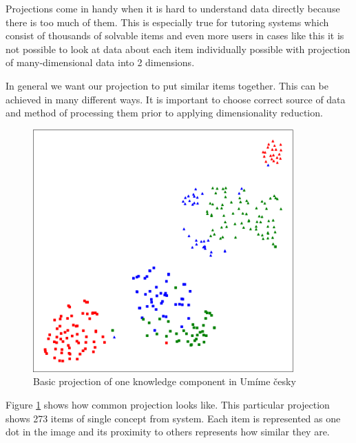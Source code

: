 \documentclass[
  digital, %
  table,   %
  nolof,     %
  nolot,     %
  nocover
]{fithesis3}
\begin{document}



Projections come in handy when it is hard to understand data directly because there is too much of them. This is especially true for tutoring systems which consist of thousands of solvable
items and even more users in cases like this it is not possible to look
at data about each item individually possible with projection of
many-dimensional data into 2 dimensions.


In general we want our projection to put similar items together. This
can be achieved in many different ways. It is important to choose
correct source of data and method of processing them prior to applying
dimensionality reduction.


\begin{figure}
  \begin{center}
    \includegraphics[width=10cm]{img/common_projection}
  \end{center}
  \caption{Basic projection of one knowledge component in Umíme česky}
  \label{fig:commonprojection}
\end{figure}

Figure \ref{fig:commonprojection} shows how common projection looks
like. This particular projection shows 273 items of single concept from
system. Each item is represented as one dot in the image and its
proximity to others represents how similar they are.
\end{document}
